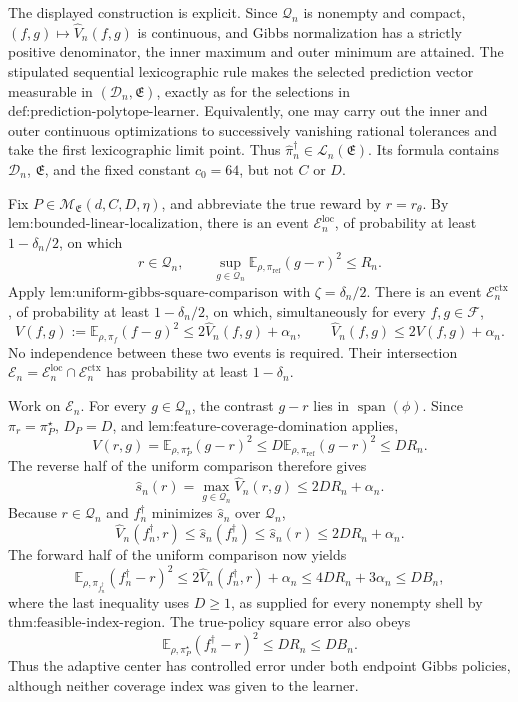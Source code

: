 The displayed construction is explicit. Since \(\mathcal Q_n\) is nonempty and compact, \((f,g)\mapsto\widehat V_n(f,g)\) is continuous, and Gibbs normalization has a strictly positive denominator, the inner maximum and outer minimum are attained. The stipulated sequential lexicographic rule makes the selected prediction vector measurable in \((\mathcal D_n,\mathfrak E)\), exactly as for the selections in \(\text{def:prediction-polytope-learner}\). Equivalently, one may carry out the inner and outer continuous optimizations to successively vanishing rational tolerances and take the first lexicographic limit point. Thus \(\widehat\pi_n^\dagger\in\mathcal L_n(\mathfrak E)\). Its formula contains \(\mathcal D_n\), \(\mathfrak E\), and the fixed constant \(c_0=64\), but not \(C\) or \(D\).

Fix \(P\in\mathcal M_{\mathfrak E}(d,C,D,\eta)\), and abbreviate the true reward by \(r=r_\theta\). By \(\text{lem:bounded-linear-localization}\), there is an event \(\mathcal E_n^{\mathrm{loc}}\), of probability at least \(1-\delta_n/2\), on which
\[
r\in\mathcal Q_n,
\qquad
\sup_{g\in\mathcal Q_n}\mathbb E_{\rho,\pi_{\mathrm{ref}}}(g-r)^2\le R_n.
\]
Apply \(\text{lem:uniform-gibbs-square-comparison}\) with \(\zeta=\delta_n/2\). There is an event \(\mathcal E_n^{\mathrm{ctx}}\), of probability at least \(1-\delta_n/2\), on which, simultaneously for every \(f,g\in\mathcal F\),
\[
V(f,g):=\mathbb E_{\rho,\pi_f}(f-g)^2
\le2\widehat V_n(f,g)+\alpha_n,
\qquad
\widehat V_n(f,g)\le2V(f,g)+\alpha_n.
\]
No independence between these two events is required. Their intersection \(\mathcal E_n=\mathcal E_n^{\mathrm{loc}}\cap\mathcal E_n^{\mathrm{ctx}}\) has probability at least \(1-\delta_n\).

Work on \(\mathcal E_n\). For every \(g\in\mathcal Q_n\), the contrast \(g-r\) lies in \(\operatorname{span}(\phi)\). Since \(\pi_r=\pi_P^\star\), \(D_P=D\), and \(\text{lem:feature-coverage-domination}\) applies,
\[
V(r,g)=\mathbb E_{\rho,\pi_P^\star}(g-r)^2
\le D\mathbb E_{\rho,\pi_{\mathrm{ref}}}(g-r)^2
\le DR_n.
\]
The reverse half of the uniform comparison therefore gives
\[
\widehat s_n(r)=\max_{g\in\mathcal Q_n}\widehat V_n(r,g)
\le2DR_n+\alpha_n.
\]
Because \(r\in\mathcal Q_n\) and \(f_n^\dagger\) minimizes \(\widehat s_n\) over \(\mathcal Q_n\),
\[
\widehat V_n(f_n^\dagger,r)
\le\widehat s_n(f_n^\dagger)
\le\widehat s_n(r)
\le2DR_n+\alpha_n.
\]
The forward half of the uniform comparison now yields
\[
\mathbb E_{\rho,\pi_{f_n^\dagger}}(f_n^\dagger-r)^2
\le2\widehat V_n(f_n^\dagger,r)+\alpha_n
\le4DR_n+3\alpha_n
\le D B_n,
\]
where the last inequality uses \(D\ge1\), as supplied for every nonempty shell by \(\text{thm:feasible-index-region}\). The true-policy square error also obeys
\[
\mathbb E_{\rho,\pi_P^\star}(f_n^\dagger-r)^2
\le DR_n\le DB_n.
\]
Thus the adaptive center has controlled error under both endpoint Gibbs policies, although neither coverage index was given to the learner.


